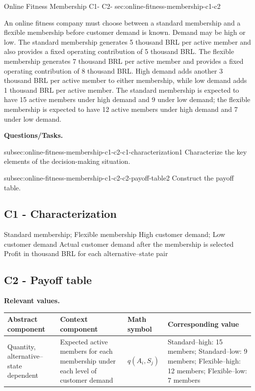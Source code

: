 	
	\sectionScored
	{Online Fitness Membership}
	{C1- \hspace{2mm} C2-}
	{sec:online-fitness-membership-c1-c2}
	{
		An online fitness company must choose between a standard membership and a flexible membership before customer demand is known. Demand may be high or low. The standard membership generates 5 thousand BRL per active member and also provides a fixed operating contribution of 5 thousand BRL. The flexible membership generates 7 thousand BRL per active member and provides a fixed operating contribution of 8 thousand BRL. High demand adds another 3 thousand BRL per active member to either membership, while low demand adds 1 thousand BRL per active member. The standard membership is expected to have 15 active members under high demand and 9 under low demand; the flexible membership is expected to have 12 active members under high demand and 7 under low demand.
		
		\textbf{Questions/Tasks.}
		\begin{enumerate}
			\CriterionTask
			{subsec:online-fitness-membership-c1-c2-c1-characterization}{1}
			{Characterize the key elements of the decision-making situation. }
			
			\CriterionTask
			{subsec:online-fitness-membership-c1-c2-c2-payoff-table}{2}
			{Construct the payoff table. }
		\end{enumerate}
		
		\label{subsec:online-fitness-membership-c1-c2-c1-characterization}
		\subsection*{C1 - Characterization }
		
		\DecisionElementsTable
		{Standard membership; Flexible membership}
		{High customer demand; Low customer demand}
		{Actual customer demand after the membership is selected}
		{Profit in thousand BRL for each alternative--state pair}
		
		\label{subsec:online-fitness-membership-c1-c2-c2-payoff-table}
		\subsection*{C2 - Payoff table }
		
		\textbf{Relevant values.}
		
		\begin{center}
			\small
			\begin{tabularx}{\textwidth}{
					>{\raggedright\arraybackslash}X
					>{\raggedright\arraybackslash}X
					>{\centering\arraybackslash}p{}
					>{\raggedright\arraybackslash}X
				}
				\toprule
				Abstract component & Context component & Math symbol & Corresponding value \\
				\midrule
				Quantity, alternative--state dependent
				&
				Expected active members for each membership under each level of customer demand
				&
				$q(A_i,S_j)$
				&
				Standard--high: 15 members; Standard--low: 9 members; Flexible--high: 12 members; Flexible--low: 7 members
				\\
				

\end{tabularx}
\end{center}}
